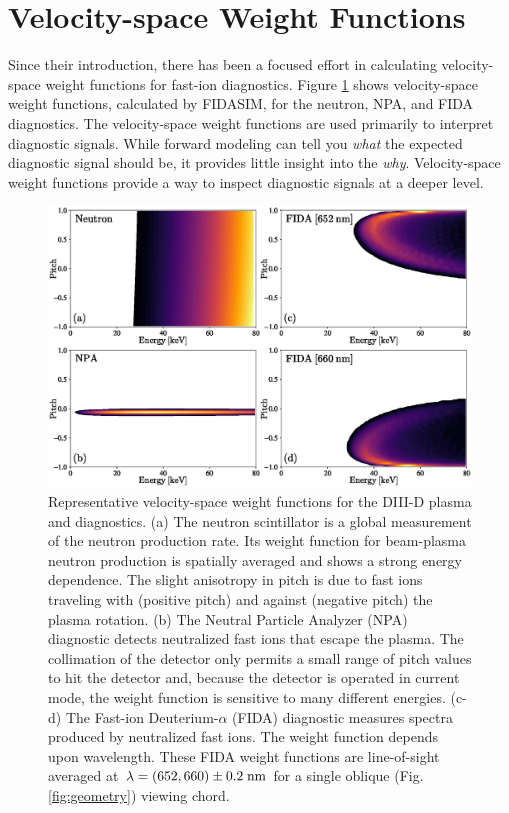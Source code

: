 \section{Velocity-space Weight Functions}
Since their introduction, there has been a focused effort in calculating velocity-space weight functions for fast-ion diagnostics\cite{salewski2011,salewski2014,jacobsen2015,salewski2015,salewski2016}. Figure \ref{fig:vs_weights} shows velocity-space weight functions, calculated by FIDASIM, for the neutron, NPA, and FIDA diagnostics. The velocity-space weight functions are used primarily to interpret diagnostic signals. While forward modeling can tell you \textit{what} the expected diagnostic signal should be, it provides little insight into the \textit{why}. Velocity-space weight functions provide a way to inspect diagnostic signals at a deeper level. 
\begin{figure}[ht]
    \centering
    \includegraphics[width=13cm]{figures/velocity_space_weights.eps}
    \caption{Representative velocity-space weight functions for the DIII-D plasma and diagnostics. (a) The neutron scintillator is a global measurement of the neutron production rate. Its weight function for beam-plasma neutron production is spatially averaged and shows a strong energy dependence. The slight anisotropy in pitch is due to fast ions traveling with (positive pitch) and against (negative pitch) the plasma rotation. (b) The Neutral Particle Analyzer (NPA) diagnostic detects neutralized fast ions that escape the plasma. The collimation of the detector only permits a small range of pitch values to hit the detector and, because the detector is operated in current mode, the weight function is sensitive to many different energies. (c-d) The Fast-ion Deuterium-$\alpha$ (FIDA) diagnostic measures spectra produced by neutralized fast ions. The weight function 
depends upon wavelength. These FIDA weight functions are line-of-sight 
averaged at $\lambda = (652,660) \pm 0.2 \;\rm{nm}$ for a single oblique (Fig. \ref{fig:geometry}) viewing chord.}
    \label{fig:vs_weights}
\end{figure}


